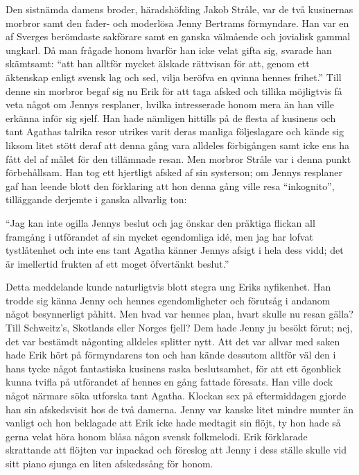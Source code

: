 Den sistnämda damens broder, häradshöfding Jakob Stråle, var de två
kusinernas morbror samt den fader- och moderlösa Jenny Bertrams
förmyndare. Han var en af Sverges berömdaste sakförare samt en ganska
välmående och jovialisk gammal ungkarl. Då man frågade honom hvarför han
icke velat gifta sig, svarade han skämtsamt: ``att han alltför mycket
älskade rättvisan för att, genom ett äktenskap enligt svensk lag och
sed, vilja beröfva en qvinna hennes frihet.'' Till denne sin morbror
begaf sig nu Erik för att taga afsked och tillika möjligtvis få veta
något om Jennys resplaner, hvilka intresserade honom mera än han ville
erkänna inför sig sjelf. Han hade nämligen hittills på de flesta af
kusinens och tant Agathas talrika resor utrikes varit deras manliga
följeslagare och kände sig liksom litet stött deraf att denna gång vara
alldeles förbigången samt icke ens ha fått del af målet för den
tillämnade resan. Men morbror Stråle var i denna punkt förbehållsam. Han
tog ett hjertligt afsked af sin systerson; om Jennys resplaner gaf han
leende blott den förklaring att hon denna gång ville resa ``inkognito'',
tilläggande derjemte i ganska allvarlig ton:

``Jag kan inte ogilla Jennys beslut och jag önskar den präktiga flickan
all framgång i utförandet af sin mycket egendomliga idé, men jag har
lofvat tystlåtenhet och inte ens tant Agatha känner Jennys afsigt i hela
dess vidd; det är imellertid frukten af ett moget öfvertänkt beslut.''

Detta meddelande kunde naturligtvis blott stegra ung Eriks nyfikenhet.
Han trodde sig känna Jenny och hennes egendomligheter och förutsåg i
andanom något besynnerligt påhitt. Men hvad var hennes plan, hvart
skulle nu resan gälla? Till Schweitz's, Skotlands eller Norges fjell?
Dem hade Jenny ju besökt förut; nej, det var bestämdt någonting alldeles
splitter nytt. Att det var allvar med saken hade Erik hört på
förmyndarens ton och han kände dessutom alltför väl den i hans tycke
något fantastiska kusinens raska beslutsamhet, för att ett ögonblick
kunna tvifla på utförandet af hennes en gång fattade föresats. Han ville
dock något närmare söka utforska tant Agatha. Klockan sex på
eftermiddagen gjorde han sin afskedsvisit hos de två damerna. Jenny var
kanske litet mindre munter än vanligt och hon beklagade att Erik icke
hade medtagit sin flöjt, ty hon hade så gerna velat höra honom blåsa
någon svensk folkmelodi. Erik förklarade skrattande att flöjten var
inpackad och föreslog att Jenny i dess ställe skulle vid sitt piano
sjunga en liten afskedssång för honom.

